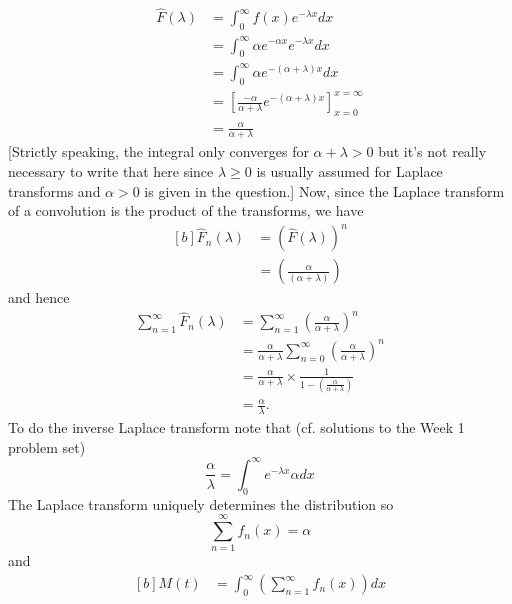 \documentclass[11pt,a4paper]{article}
\begin{document}
\begin{enumerate}
\begin{enumerate}
\begin{align*}
        \hat{F}(\lambda)
        &= \int_0^\infty f(x)e^{-\lambda x}dx\\
        &= \int_0^\infty \alpha e^{-\alpha x}e^{-\lambda x}dx\\
        &= \int_0^\infty \alpha e^{-(\alpha + \lambda)x}dx\\
        &= \left[\frac{-\alpha}{\alpha + \lambda}e^{-(\alpha + \lambda)x}\right]_{x = 0}^{x = \infty}\\
        &= \frac{\alpha}{\alpha + \lambda}
      \end{align*}
      [Strictly speaking, the integral only converges for $\alpha + \lambda > 0$ but it's not really necessary to write that here since $\lambda \geq 0$ is usually assumed for Laplace transforms and $\alpha > 0$ is given in the question.] Now, since the Laplace transform of a convolution is the product of the transforms, we have
      \begin{equation}\tag{2.4}
        \begin{aligned}[b]
          \hat{F}_n(\lambda) 
          &= (\hat{F}(\lambda))^n\\
          &= \left(\frac{\alpha}{(\alpha + \lambda)}\right)
        \end{aligned}
      \end{equation}
      and hence
      \begin{align*}
        \sum_{n = 1}^\infty\hat{F}_n(\lambda)
        &= \sum_{n = 1}^\infty \left(\frac{\alpha}{\alpha + \lambda}\right)^n\\
        &= \frac{\alpha}{\alpha + \lambda}\sum_{n = 0}^\infty\left(\frac{\alpha}{\alpha + \lambda}\right)^n\\
        &= \frac{\alpha}{\alpha + \lambda}\times \frac{1}{1 - \left(\frac{\alpha}{\alpha + \lambda}\right)}\\
        &= \frac{\alpha}{\lambda}.
      \end{align*}
      To do the inverse Laplace transform note that (cf. solutions to the Week 1 problem set)
      \begin{equation}\tag{2.5}
        \frac{\alpha}{\lambda} = \int_0^\infty e^{-\lambda x}\alpha dx
      \end{equation}
      The Laplace transform uniquely determines the distribution so
      $$
      \sum_{n = 1}^\infty f_n(x) = \alpha
      $$
      and
      \begin{equation}\tag{2.6}
        \begin{aligned}[b]
          M(t)
          &= \int_0^\infty\left(\sum_{n = 1}^\infty f_n(x)\right)dx\\

\end{aligned}
\end{equation}
\end{enumerate}
\end{enumerate}
\end{document}
